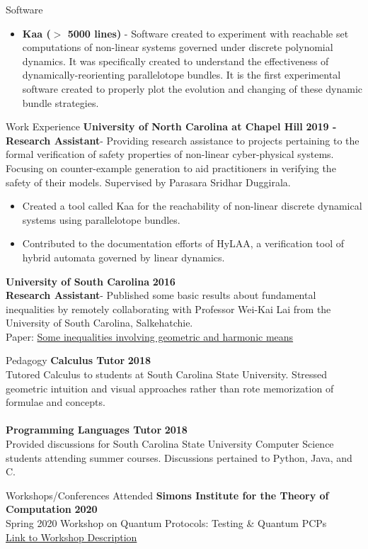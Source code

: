 \documentclass{resume} %
\begin{document}
\begin{rSection}{Software}
  \begin{itemize}
    \item {\bf Kaa ($>$ 5000 lines)} - Software created to experiment with reachable set computations of non-linear systems governed under discrete polynomial dynamics. It was specifically created to understand the effectiveness of dynamically-reorienting parallelotope bundles. It is the first experimental software created to properly plot the evolution and changing of these dynamic bundle strategies. \\
  \end{itemize}
\end{rSection}

\begin{rSection}{Work Experience}
{\bf University of North Carolina at Chapel Hill} \hfill {\bf 2019 -} \\
{\bf Research Assistant}- Providing research assistance to projects pertaining to the formal verification of safety properties of non-linear cyber-physical systems. Focusing on counter-example generation to aid practitioners in verifying the safety of their models. Supervised by Parasara Sridhar Duggirala.
\begin{itemize}
\item Created a tool called Kaa for the reachability of non-linear discrete dynamical systems using parallelotope bundles.
\item Contributed to the documentation efforts of HyLAA, a verification tool of hybrid automata governed by linear dynamics.
\end{itemize}

{\bf University of South Carolina} \hfill {\bf 2016} \\
{\bf Research Assistant}- Published some basic results about fundamental inequalities by remotely collaborating with Professor Wei-Kai Lai from the University of South Carolina, Salkehatchie. \\
Paper: \href{http://www.m-hikari.com/imf/imf-2016/1-4-2016/51190.html}{Some inequalities involving geometric and harmonic means}
\end{rSection}

\begin{rSection}{Pedagogy}
{\bf Calculus Tutor} \hfill {\bf 2018} \\
Tutored Calculus to students at South Carolina State University. Stressed geometric intuition and visual approaches rather than rote memorization of formulae and concepts. \\
\\
{\bf Programming Languages Tutor} \hfill {\bf 2018} \\
Provided discussions for South Carolina State University Computer Science students attending summer courses. Discussions pertained to Python, Java, and C. \\
\end{rSection}


\begin{rSection}{Workshops/Conferences Attended}
{\bf Simons Institute for the Theory of Computation} \hfill {\bf 2020} \\
Spring 2020 Workshop on Quantum Protocols: Testing \& Quantum PCPs \\
\href{https://simons.berkeley.edu/workshops/quantum-2020-2}{Link to Workshop Description}
\end{rSection}
\end{document}

